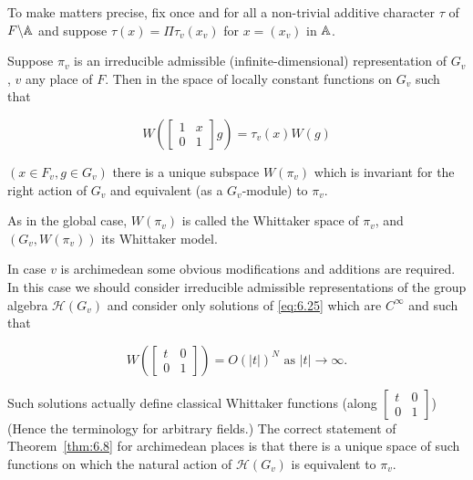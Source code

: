 To make matters precise, fix once and for all a non-trivial additive character $\tau$ of $F \backslash \mathbb{A}$ and suppose $\tau(x) = \Pi\tau_v(x_v)$ for $x = (x_v)$ in $\mathbb{A}$.

\begin{theorem}\label{thm:6.8}

Suppose $\pi_v$ is an irreducible admissible (infinite-dimensional) representation of $G_v$, $v$ any place of $F$. Then in the space of locally constant functions on $G_v$ such that

\begin{equation}\label{eq:6.25}
W\!\left(\begin{bmatrix} 1 & x \\ 0 & 1 \end{bmatrix} g\right) = \tau_v(x)W(g)\tag{6.25}
\end{equation}

$(x \in F_v, g \in G_v)$ there is a unique subspace $W(\pi_v)$ which is invariant for the right action of $G_v$ and equivalent (as a $G_v$-module) to $\pi_v$.

\end{theorem}

As in the global case, $W(\pi_v)$ is called the Whittaker space of $\pi_v$, and $(G_v, W(\pi_v))$ its Whittaker model.

\begin{remark}\label{rem:6.9}

In case $v$ is archimedean some obvious modifications and additions are required. In this case we should consider irreducible admissible representations of the group algebra $\mathcal{H}(G_v)$ and consider only solutions of \eqref{eq:6.25} which are $C^{\infty}$ and such that

\begin{equation}\label{eq:6.26}
W\!\left(\begin{bmatrix} t & 0 \\ 0 & 1 \end{bmatrix}\right) = O(|t|)^N \text{ as } |t| \to \infty.\tag{6.26}
\end{equation}

Such solutions actually define classical Whittaker functions (along $\begin{bmatrix} t & 0 \\ 0 & 1 \end{bmatrix}$) (Hence the terminology for arbitrary fields.) The correct statement of Theorem~\ref{thm:6.8} for archimedean places is that there is a unique space of such functions on which the natural action of $\mathcal{H}(G_v)$ is equivalent to $\pi_v$.

\end{remark}

